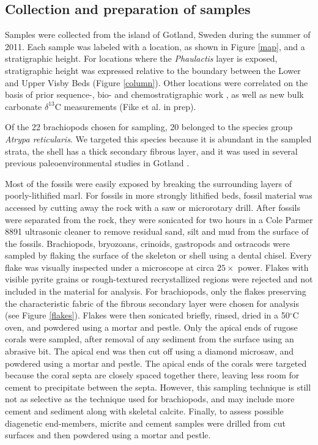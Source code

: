 \documentclass[5p, authoryear]{elsarticle}
\begin{document}
\subsection{Collection and preparation of samples}

Samples were collected from the island of Gotland, Sweden during the summer of 2011. Each sample was labeled with a location, as shown in Figure \ref{map}, and a stratigraphic height. For locations where the \textit{Phaulactis} layer is exposed, stratigraphic height was expressed relative to the boundary between the Lower and Upper Visby Beds (Figure \ref{column}). Other locations were correlated on the basis of prior sequence-, bio- and chemostratigraphic work \citep{Calner2004a}, as well as new bulk carbonate $\delta^{13}$C measurements (Fike et al. in prep).

Of the 22 brachiopods chosen for sampling, 20 belonged to the species group \textit{Atrypa reticularis}. We targeted this species because it is abundant in the sampled strata, the shell has a thick secondary fibrous layer, and it was used in several previous paleoenvironmental studies in Gotland \citep{Bickert1997, Munnecke2003, Samtleben2001}. 

Most of the fossils were easily exposed by breaking the surrounding layers of poorly-lithified marl. For fossils in more strongly lithified beds, fossil material was accessed by cutting away the rock with a saw or microrotary drill. After fossils were separated from the rock, they were sonicated for two hours in a Cole Parmer 8891 ultrasonic cleaner to remove residual sand, silt and mud from the surface of the fossils. Brachiopods, bryozoans, crinoids, gastropods and ostracods were sampled by flaking the surface of the skeleton or shell using a dental chisel. Every flake was visually inspected under a microscope at circa $25\times$ power. Flakes with visible pyrite grains or rough-textured recrystallized regions were rejected and not included in the material for analysis. For brachiopods, only the flakes preserving the characteristic fabric of the fibrous secondary layer were chosen for analysis (see Figure \ref{flakes}). Flakes were then sonicated briefly, rinsed, dried in a 50$^{\circ}$C oven, and powdered using a mortar and pestle. Only the apical ends of rugose corals were sampled, after removal of any sediment from the surface using an abrasive bit. The apical end was then cut off using a diamond microsaw, and powdered using a mortar and pestle. The apical ends of the corals were targeted because the coral septa are closely spaced together there, leaving less room for cement to precipitate between the septa. However, this sampling technique is still not as selective as the technique used for brachiopods, and may include more cement and sediment along with skeletal calcite. Finally, to assess possible diagenetic end-members, micrite and cement samples were drilled from cut surfaces and then powdered using a mortar and pestle. 
\end{document}
